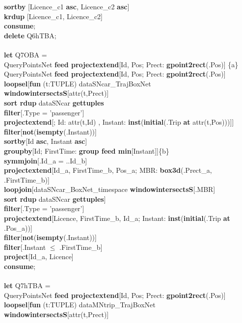 \documentclass[a4paper]{article}
\newcommand{\op}[1]{\textbf{#1}}
\begin{document}
\begin{scriptsize}
\begin{tabbing}
\>\op{sortby} [Licence\_c1 \op{asc}, Licence\_c2 \op{asc}]\\
\>\op{krdup} [Licence\_c1, Licence\_c2]\\
\op{consume};\\
\op{delete} Q6hTBA;\\
\\
\op{let} Q7OBA =\\
\>QueryPointsNet \op{feed projectextend}[Id, Pos; Prect: \op{gpoint2rect}(.Pos)] \{a\}\\
\>QueryPointsNet \op{feed projectextend}[Id, Pos; Prect: \op{gpoint2rect}(.Pos)]\\
\>\>\op{loopsel}[\op{fun} (t:TUPLE) dataSNcar\_TrajBoxNet \op{windowintersectsS}[attr(t,Prect)]\\
\>\>\>\>\op{sort rdup} dataSNcar \op{gettuples}\\
\>\>\>\op{filter}[.Type = 'passenger']\\
\>\>\>\op{projectextend}[; Id: attr(t,Id) , Instant: \op{inst}(\op{initial}(.Trip \op{at} attr(t,Pos)))]]\\
\>\>\>\op{filter}[\op{not}(\op{isempty}(.Instant))]\\
\>\>\>\op{sortby}[Id \op{asc}, Instant \op{asc}]\\
\>\>\>\op{groupby}[Id; FirstTime: \op{group feed min}[Instant]]\{b\}\\
\>\op{symmjoin}[.Id\_a = ..Id\_b]\\
\>\op{projectextend}[Id\_a, FirstTime\_b, Pos\_a; MBR: \op{box3d}(.Prect\_a, .FirstTime\_b)]\\
\>\op{loopjoin}[dataSNcar\_BoxNet\_timespace \op{windowintersectsS}[.MBR]\\
\>\>\>\>\op{sort rdup} dataSNcar \op{gettuples}]\\
\>\op{filter}[.Type = 'passenger']\\
\>\op{projectextend}[Licence, FirstTime\_b, Id\_a; Instant: \op{inst}(\op{initial}(.Trip \op{at} .Pos\_a))]\\
\>\op{filter}[\op{not}(\op{isempty}(.Instant))]\\
\>\op{filter}[.Instant $\leq$ .FirstTime\_b]\\
\>\op{project}[Id\_a, Licence]\\
\op{consume};\\
\\
\op{let} Q7hTBA =\\
\>QueryPointsNet \op{feed projectextend}[Id, Pos; Prect: \op{gpoint2rect}(.Pos)]\\
\>\op{loopsel}[\op{fun} (t:TUPLE) dataMNtrip\_TrajBoxNet \op{windowintersectsS}[attr(t,Prect)]\\

\end{tabbing}
\end{scriptsize}
\end{document}

